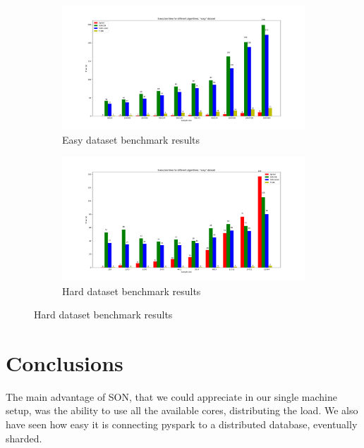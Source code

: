 \documentclass[a4paper]{article}
\begin{document}
	\begin{figure}[h]
		\centering
		\begin{subfigure}[b]{1\textwidth}
			\centering
			\includegraphics[width=\textwidth]{benchmarkeasy.png}
         	\caption{Easy dataset benchmark results}
         	\label{fig:easybenchmark}
		\end{subfigure}
		\hfill
		
		\begin{subfigure}[b]{1\textwidth}
			\centering
			\includegraphics[width=\textwidth]{benchmarkhard.png}
         	\caption{Hard dataset benchmark results}
         	\label{fig:hardbenchmark}
		\end{subfigure}
		\hfill
		
	\end{figure}

	
	\section{Conclusions}
	The main advantage of SON, that we could appreciate in our single machine setup, was the ability to use all the available cores, distributing the load. We also have seen how easy it is connecting pyspark 
	to a distributed database, eventually sharded.
	
\end{document}
